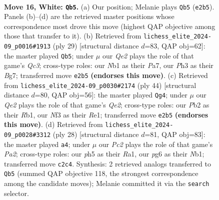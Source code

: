 \documentclass[11pt]{article}
\begin{document}
\clearpage

\begin{figure}[p]\centering
\begin{subfigure}{0.46\textwidth}\centering
\resizebox{\linewidth}{!}{%
\newchessgame
\chessboard[
  setfen={rnbqr1k1/pp3pb1/4pnp1/3p3p/P2P4/1B3NPP/RPP1QP2/1NB1R1K1 w - - 0 16},
  showmover=false,
  pgfstyle=straightmove, color=movearrow, markmove={e2-b5}
]}
\caption{}
\end{subfigure}\hfill
\begin{subfigure}{0.46\textwidth}\centering
\resizebox{\linewidth}{!}{%
\newchessgame
\chessboard[
  setfen={1rr3k1/p3ppbp/2q2np1/3p1b2/3P4/2P1BN1P/PP1N1PP1/R1Q1R1K1 b - - 3 15},
  showmover=false,
  pgfstyle=straightmove, color=movearrow, markmove={c6-b5}
]}
\caption{}
\end{subfigure}
\\[4pt]
\begin{subfigure}{0.46\textwidth}\centering
\resizebox{\linewidth}{!}{%
\newchessgame
\chessboard[
  setfen={r3rbk1/1pqnnppb/7p/p3p3/2Pp3N/PP1P2NP/2B1QPP1/1RB1R1K1 w - - 8 23},
  showmover=false,
  pgfstyle=straightmove, color=movearrow, markmove={e2-g4}
]}
\caption{}
\end{subfigure}\hfill
\begin{subfigure}{0.46\textwidth}\centering
\resizebox{\linewidth}{!}{%
\newchessgame
\chessboard[
  setfen={rb1q1rk1/1b2nppp/p2p2n1/1p2p3/4P3/1BPQ1N1P/PP3PP1/RNBR2K1 w - - 1 15},
  showmover=false,
  pgfstyle=straightmove, color=movearrow, markmove={a2-a4}
]}
\caption{}
\end{subfigure}
\caption{\textbf{Move 16, White: \texttt{Qb5}.} (a) Our position; Melanie plays \texttt{Qb5} (\texttt{e2b5}). Panels (b)--(d) are the retrieved master positions whose correspondence most drove this move (highest QAP objective among those that transfer to it). (b) Retrieved from \texttt{lichess\_elite\_2024-09\_p0016\#1913} (ply 29) [structural distance $d$=83, QAP obj=62]: the master played \texttt{Qb5}; under $\mu$ our \emph{Qe2} plays the role of that game's \emph{Qc3}; cross-type roles: our \emph{N}b1 as their \emph{P}a7, our \emph{P}h3 as their \emph{B}g7; transferred move \texttt{e2b5} \textbf{(endorses this move)}. (c) Retrieved from \texttt{lichess\_elite\_2024-09\_p0030\#2174} (ply 44) [structural distance $d$=80, QAP obj=56]: the master played \texttt{Qg4}; under $\mu$ our \emph{Qe2} plays the role of that game's \emph{Qe2}; cross-type roles: our \emph{P}b2 as their \emph{R}b1, our \emph{N}f3 as their \emph{R}e1; transferred move \texttt{e2b5} \textbf{(endorses this move)}. (d) Retrieved from \texttt{lichess\_elite\_2024-09\_p0028\#3312} (ply 28) [structural distance $d$=81, QAP obj=83]: the master played \texttt{a4}; under $\mu$ our \emph{Pc2} plays the role of that game's \emph{Pa2}; cross-type roles: our \emph{p}h5 as their \emph{R}a1, our \emph{p}g6 as their \emph{N}b1; transferred move \texttt{c2c4}. Synthesis: 2 retrieved analogs transferred to \texttt{Qb5} (summed QAP objective 118, the strongest correspondence among the candidate moves); Melanie committed it via the \texttt{search} selector.}
\label{fig:thought-m30}
\end{figure}
\end{document}
